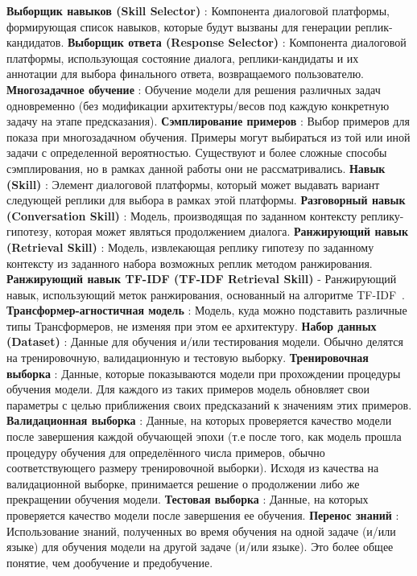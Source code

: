 \textbf{Выборщик навыков (Skill Selector)} : Компонента диалоговой платформы, формирующая список навыков, которые будут вызваны для генерации реплик-кандидатов.
\textbf{Выборщик ответа (Response Selector)} : Компонента диалоговой платформы, использующая состояние диалога, реплики-кандидаты и их аннотации для выбора финального ответа, возвращаемого пользователю.
\textbf{Многозадачное обучение} : Обучение модели для решения различных задач одновременно (без модификации архитектуры/весов под каждую конкретную задачу на этапе предсказания). 
\textbf{Сэмплирование примеров} : Выбор примеров для показа при многозадачном обучения. Примеры могут выбираться из той или иной задачи с определенной вероятностью. Существуют и более сложные способы сэмплирования, но в рамках данной работы они не рассматривались. 
\textbf{Навык (Skill)} : Элемент диалоговой платформы, который может выдавать вариант следующей реплики для выбора в рамках этой платформы. 
 \textbf{Разговорный навык (Conversation Skill)} : Модель, производящая по
заданном контексту реплику-гипотезу, которая может являться продолжением диалога.
\textbf{Ранжирующий навык (Retrieval Skill)} : Модель, извлекающая реплику гипотезу по заданному контексту из заданного набора возможных реплик методом ранжирования.
\textbf{Ранжирующий навык TF-IDF (TF-IDF Retrieval Skill)} - Ранжирующий навык, использующий меток ранжирования, основанный на алгоритме TF-IDF~\cite{tfidf}. 
\textbf{Трансформер-агностичная модель} : Модель, куда можно подставить различные типы Трансформеров, не  изменяя при этом ее архитектуру. 
\textbf{Набор данных (Dataset)} : Данные для обучения и/или тестирования модели. Обычно делятся на тренировочную, валидационную и тестовую выборку. 
\textbf{Тренировочная выборка} : Данные, которые показываются модели при прохождении процедуры обучения модели. Для каждого из таких примеров модель обновляет свои параметры с целью приближения своих предсказаний к значениям этих примеров. 
\textbf{Валидационная выборка} : Данные, на которых проверяется качество модели после завершения каждой обучающей эпохи (т.е после того, как модель прошла процедуру обучения для определённого числа примеров, обычно соответствующего размеру тренировочной выборки). Исходя из качества на валидационной выборке, принимается решение о продолжении либо же прекращении обучения модели. 
\textbf{Тестовая выборка} : Данные, на которых проверяется качество модели после завершения ее обучения. 
\textbf{Перенос знаний} : Использование знаний, полученных во время обучения на одной задаче (и/или языке) для обучения модели на другой задаче (и/или языке). Это более общее понятие, чем дообучение и предобучение.
